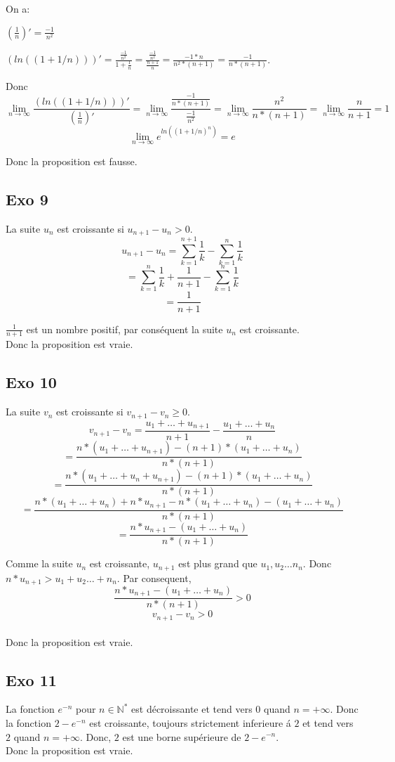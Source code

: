 \documentclass[]{book}
\theoremstyle{definition}
\begin{document}
On a:


 $(\frac{1}{n})' =  \frac{-1}{n^2}$ 


$(ln((1+1/n)))' = \frac{\frac{-1}{n^2}}{1+\frac{1}{n}} = \frac{\frac{-1}{n^2}}{\frac{n+1}{n}} = \frac{-1*n}{n^2*(n+1)} 
= \frac{-1}{n*(n+1)}$.


Donc
$$
 \lim_{n \to \infty} \frac{(ln((1+1/n)))'}{(\frac{1}{n})'} = 
 \lim_{n \to \infty} \frac{\frac{-1}{n*(n+1)}}{\frac{-1}{n^2}} = 
 \lim_{n \to \infty} \frac{n^2}{n*(n+1)} =
 \lim_{n \to \infty} \frac{n}{n+1} = 1$$
$$\lim_{n \to \infty} e^{ln((1+1/n)^n)} = e$$

Donc la proposition est fausse.


\subsection*{Exo 9}
La suite $u_n$ est croissante si $u_{n+1} - u_{n} > 0$.
$$u_{n+1} - u_{n} = \sum_{k=1}^{n+1} \frac{1}{k} - \sum_{k=1}^{n} \frac{1}{k}$$
$$ = \sum_{k=1}^{n} \frac{1}{k} + \frac{1}{n+1} - \sum_{k=1}^{n} \frac{1}{k}$$
$$ = \frac{1}{n+1} $$

$\frac{1}{n+1}$ est un nombre positif, par cons\'equent la suite $u_n$ est croissante.
\\ 
Donc la proposition est vraie.


\subsection*{Exo 10}
La suite $v_n$ est croissante si $v_{n+1} -v_n  \geq 0$.
$$v_{n+1} -v_n = \frac{u_1+ \ldots +u_{n+1}}{n+1} - \frac{u_1+ \ldots +u_{n}}{n}$$
$$= \frac{n*(u_1+ \ldots +u_{n+1}) - (n+1)*(u_1+ \ldots +u_{n})}  {n*(n+1)}$$
$$= \frac{n*(u_1+ \ldots +u_{n}+u_{n+1}) - (n+1)*(u_1+ \ldots +u_{n})}  {n*(n+1)}$$
$$= \frac{n*(u_1+ \ldots +u_n) + n*u_{n+1} - n*(u_1+ \ldots +u_{n}) - (u_1+ \ldots +u_{n})}  {n*(n+1)}$$
$$= \frac{ n*u_{n+1} - (u_1+ \ldots +u_{n})}  {n*(n+1)}$$

Comme la suite $u_n$ est croissante, $u_{n+1}$ est plus grand que $u_{1}, u_{2} \ldots n_{n}$. Donc $n*u_{n+1} > u_{1}+ u_{2} \ldots +n_{n}$. Par consequent,
$$\frac{ n*u_{n+1} - (u_1+ \ldots +u_{n})}  {n*(n+1)} > 0$$
$$v_{n+1} -v_n  > 0$$
\\ 
Donc la proposition est vraie.

\subsection*{Exo 11}
La fonction $e^{-n}$ pour $n \in \mathbb{N}^*$ est d\'ecroissante et tend vers $0$ quand $n=+\infty$. Donc la fonction $2-e^{-n}$ est croissante, toujours strictement inferieure \'a $2$ et tend vers $2$ quand $n=+\infty$. Donc, $2$ est une borne sup\'erieure de $2-e^{-n}$.
\\ 
Donc la proposition est vraie.
\end{document}
